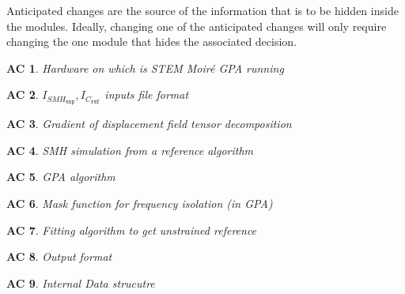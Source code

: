 \documentclass[12pt, titlepage]{article}
\newcommand{\progname}{STEM Moir{\'e} GPA}
\newtheorem{AC}{AC}
\begin{document}
Anticipated changes are the source of the information that is to be hidden
inside the modules. Ideally, changing one of the anticipated changes will only
require changing the one module that hides the associated decision. 

\begin{AC}\normalfont Hardware on which is \progname{} running
\label{AC_Hardware}
\end{AC}

\begin{AC}\normalfont 
$I_{\mathit{SMH}_{\texttt{exp}}},I_{\mathit{C}_{\texttt{ref}}}$ inputs file 
format
\label{AC_FormatFile}
\end{AC}

\begin{AC}\normalfont Gradient of displacement field tensor decomposition
\label{AC_Assum_SmallStrain}
\end{AC}

\begin{AC}\normalfont SMH simulation from a reference algorithm
\label{AC_SMH_algo}
\end{AC}

\begin{AC}\normalfont GPA algorithm
\label{AC_GPA_algo}
\end{AC}

\begin{AC}\normalfont Mask function for frequency isolation (in GPA)
\label{AC_Mask}
\end{AC}

\begin{AC}\normalfont Fitting algorithm to get unstrained reference 
\label{AC_RefFit}
\end{AC}

\begin{AC}\normalfont Output format
\label{AC_Output}
\end{AC}

\begin{AC}\normalfont Internal Data strucutre
\label{AC_Data}
\end{AC}
\end{document}
